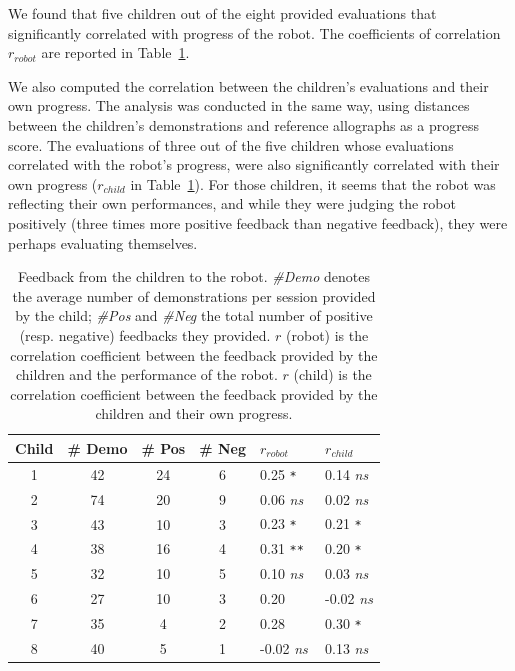 \documentclass[10pt,a4paper]{article}
\begin{document}
We found that five children out of the eight provided evaluations that significantly correlated with progress of the robot. The coefficients of correlation $r_{robot}$ are reported in Table~\ref{table:scores}.

We also computed the correlation between the children's evaluations and their own
progress. The analysis was conducted in the same way, using distances between the children's demonstrations and reference allographs as a progress score.
The evaluations of three out of the five children whose evaluations correlated with the robot's progress, were also significantly correlated with their own progress ($r_{child}$ in Table~\ref{table:scores}). For
those children, it seems that the robot was reflecting their own performances, and while they
were judging the robot positively (three times more positive feedback than negative feedback),
they were perhaps evaluating themselves.


\begin{table}
    \centering
    \caption{\footnotesize Feedback from the children to the robot. \emph{\#Demo}
        denotes the average number of demonstrations per session provided by the child;
        \emph{\#Pos} and \emph{\#Neg} the total number of positive (resp.
        negative) feedbacks they provided. $r$ (robot) is the correlation coefficient
        between the feedback provided by the children and the performance of the
        robot. $r$ (child) is the correlation coefficient
        between the feedback provided by the children and their own progress.
        }
    \begin{tabular}{ccccll}
        \toprule
        \bf Child      & \bf \# Demo & \bf \# Pos & \bf \# Neg & $r_{robot}$ & $r_{child}$ \\ \midrule
        1 & 42           & 24              & 6               & 0.25 \small\tt ** & 0.14 \small\it ns\\ 
        2 & 74           & 20              & 9               & 0.06 \small\it ns & 0.02 \small\it ns\\
        3 & 43           & 10              & 3               & 0.23 \small\tt ** & 0.21 \small\tt **\\
        4 & 38           & 16              & 4               & 0.31 \small\tt *** & 0.20 \small\tt **\\
        5   & 32           & 10              & 5               & 0.10 \small\it ns & 0.03 \small\it ns\\
        6 & 27           & 10              & 3               & 0.20 \small\tt * & -0.02 \small\it ns \\
        7   & 35           & 4               & 2               & 0.28 \small\tt * & 0.30 \small\tt ** \\
        8   & 40           & 5               & 1               & -0.02 \small\it ns & 0.13 \small\it ns\\ \bottomrule
    \end{tabular}

    \label{table:scores}
\end{table}
\end{document}
